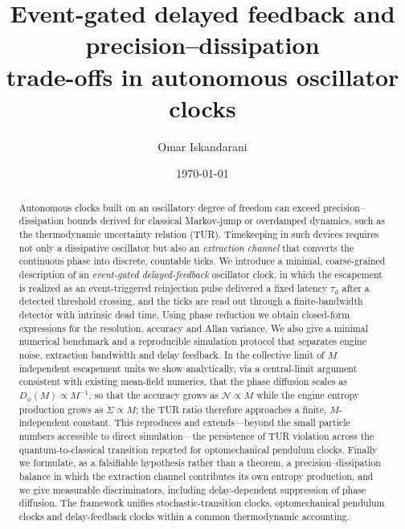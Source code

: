 \documentclass[aps,pre,reprint,amsmath,amssymb,floatfix,nofootinbib]{revtex4-2}
\newcommand{\Sdot}{\dot{\Sigma}}
\newcommand{\Dphi}{D_{\phi}}
\newcommand{\taud}{\tau_{\mathrm{d}}}
\begin{document}
\title{Event-gated delayed feedback and precision--dissipation\\
trade-offs in autonomous oscillator clocks}

\author{Omar Iskandarani}

\date{\today}

\begin{abstract}
Autonomous clocks built on an oscillatory degree of freedom can exceed
precision--dissipation bounds derived for classical Markov-jump or
overdamped dynamics, such as the thermodynamic uncertainty relation
(TUR). Timekeeping in such devices requires not only a dissipative
oscillator but also an \emph{extraction channel} that converts the
continuous phase into discrete, countable ticks. We introduce a minimal,
coarse-grained description of an \emph{event-gated delayed-feedback}
oscillator clock, in which the escapement is realized as an
event-triggered reinjection pulse delivered a fixed latency $\taud$ after
a detected threshold crossing, and the ticks are read out through a
finite-bandwidth detector with intrinsic dead time. Using phase reduction
we obtain closed-form expressions for the resolution, accuracy and Allan
variance. We also give a minimal numerical benchmark and a reproducible
simulation protocol that separates engine noise, extraction bandwidth and
delay feedback. In the collective limit of $M$
independent escapement units we show analytically, via a central-limit
argument consistent with existing mean-field numerics, that the phase
diffusion scales as $\Dphi(M)\propto M^{-1}$, so that the accuracy grows
as $\mathcal{N}\propto M$ while the engine entropy production grows as
$\Sdot\propto M$; the TUR ratio therefore approaches a finite,
$M$-independent constant. This reproduces and extends---beyond the small
particle numbers accessible to direct simulation---the persistence of TUR
violation across the quantum-to-classical transition reported for
optomechanical pendulum clocks. Finally we formulate, as a falsifiable
hypothesis rather than a theorem, a precision--dissipation balance in
which the extraction channel contributes its own entropy production, and
we give measurable discriminators, including delay-dependent suppression
of phase diffusion. The framework unifies stochastic-transition clocks,
optomechanical pendulum clocks and delay-feedback clocks within a common
thermodynamic accounting.
\end{abstract}

\maketitle
\end{document}
